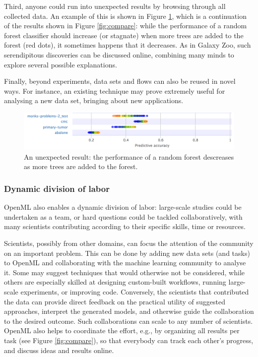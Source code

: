 \documentclass{acmproc-sp}
\begin{document}
Third, anyone could run into unexpected results by browsing through all collected data. An example of this is shown in Figure \ref{fig:unexpected}, which is a continuation of the results shown in Figure \ref{fig:compare}: while the performance of a random forest classifier should increase (or stagnate) when more trees are added to the forest (red dots), it sometimes happens that it decreases. As in Galaxy Zoo, such serendipitous discoveries can be discussed online, combining many minds to explore several possible explanations. 

Finally, beyond experiments, data sets and flows can also be reused in novel ways. For instance, an existing technique may prove extremely useful for analysing a new data set, bringing about new applications.

\begin{figure}[b]
\centering
\includegraphics[width=\columnwidth]{openml-unexpected.png}
\caption{\label{fig:unexpected} An unexpected result: the performance of a random forest descreases as more trees are added to the forest.}
\end{figure}

\subsubsection{Dynamic division of labor}
\label{proofdynamic}
OpenML also enables a dynamic division of labor: large-scale studies could be undertaken as a team, or hard questions could be tackled collaboratively, with many scientists contributing according to their specific skills, time or resources. 

Scientists, possibly from other domains, can focus the attention of the community on an important problem. This can be done by adding new data sets (and tasks) to OpenML and collaborating with the machine learning community to analyse it. Some may suggest techniques that would otherwise not be considered, while others are especially skilled at designing custom-built workflows, running large-scale experiments, or improving code. Conversely, the scientists that contributed the data can provide direct feedback on the practical utility of suggested approaches, interpret the generated models, and otherwise guide the collaboration to the desired outcome. Such collaborations can scale to any number of scientists. OpenML also helps to coordinate the effort, e.g., by organizing all results per task (see Figure \ref{fig:compare}), so that everybody can track each other's progress, and discuss ideas and results online. 
\end{document}
